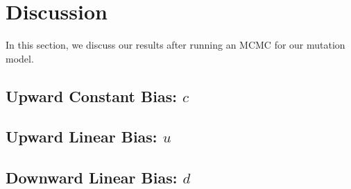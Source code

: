 \section{Discussion}\label{sec:di}
In this section, we discuss our results after running an MCMC for our mutation model.

\subsection{Upward Constant Bias: $c$}\label{subsec:ucb}
\subsection{Upward Linear Bias: $u$}\label{subsec:ulb}
\subsection{Downward Linear Bias: $d$}\label{subsec:dlb}